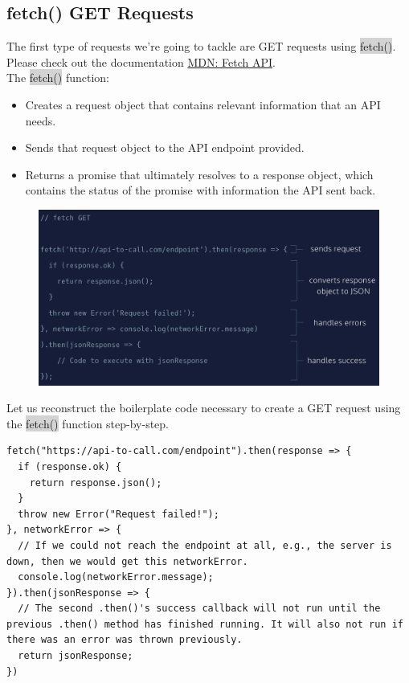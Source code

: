 \documentclass[11pt]{article}
\begin{document}
\subsection{fetch() GET Requests}
The first type of requests we’re going to tackle are GET requests using \colorbox{lightgray}{fetch()}. Please check out the documentation \href{https://developer.mozilla.org/en-US/docs/Web/API/Fetch_API}{MDN: Fetch API}. \\
\newline
The \colorbox{lightgray}{fetch()} function:
\begin{itemize}[leftmargin = *]
\item Creates a request object that contains relevant information that an API needs.
\item Sends that request object to the API endpoint provided.
\item Returns a promise that ultimately resolves to a response object, which contains the status of the promise with information the API sent back.
\end{itemize}
\begin{figure}[H]
\includegraphics[scale = 0.35]{18_1}
\centering
\end{figure}
Let us reconstruct the boilerplate code necessary to create a GET request using the \colorbox{lightgray}{fetch()} function step-by-step.
\begin{lstlisting}
fetch("https://api-to-call.com/endpoint").then(response => {
  if (response.ok) {
    return response.json(); 
  }
  throw new Error("Request failed!");
}, networkError => {
  // If we could not reach the endpoint at all, e.g., the server is down, then we would get this networkError.
  console.log(networkError.message);
}).then(jsonResponse => {
  // The second .then()'s success callback will not run until the previous .then() method has finished running. It will also not run if there was an error was thrown previously.
  return jsonResponse; 
}) 
\end{lstlisting}
\end{document}
